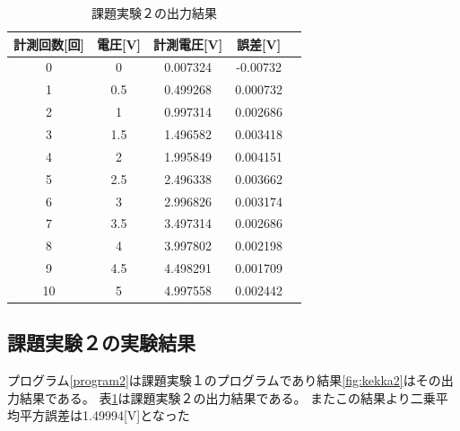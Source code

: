 \documentclass[11pt,dvipdfmx]{jarticle}
\begin{document}
				\begin{table}[H]
					\centering
					\caption{課題実験２の出力結果}
					\label{tab:task2}
					\begin{tabular}{|c|c|c|c|c|}
					\hline
					計測回数[回]&電圧[V]&計測電圧[V]&誤差[V]\\
					\hline
					0  & 0   & 0.007324 & -0.00732 \\
					1  & 0.5 & 0.499268 & 0.000732 \\
					2  & 1   & 0.997314 & 0.002686 \\
					3  & 1.5 & 1.496582 & 0.003418 \\
					4  & 2   & 1.995849 & 0.004151 \\
					5  & 2.5 & 2.496338 & 0.003662 \\
					6  & 3   & 2.996826 & 0.003174 \\
					7  & 3.5 & 3.497314 & 0.002686 \\
					8  & 4   & 3.997802 & 0.002198 \\
					9  & 4.5 & 4.498291 & 0.001709 \\
					10 & 5   & 4.997558 & 0.002442\\
					\hline
					\end{tabular}
					\end{table}

	\subsection{課題実験２の実験結果}
		プログラム\ref{program2}は課題実験１のプログラムであり結果\ref{fig:kekka2}はその出力結果である。
		表\ref{tab:task2}は課題実験２の出力結果である。
		またこの結果より二乗平均平方誤差は1.49994[V]となった
\end{document}
